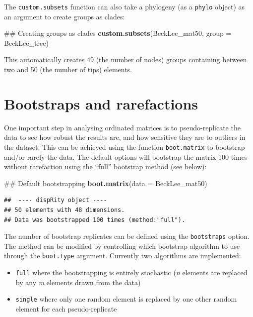 \documentclass[]{book}
\newenvironment{Shaded}{\begin{snugshade}}{\end{snugshade}}
\newcommand{\KeywordTok}[1]{\textcolor[rgb]{0.13,0.29,0.53}{\textbf{#1}}}
\newcommand{\DataTypeTok}[1]{\textcolor[rgb]{0.13,0.29,0.53}{#1}}
\newcommand{\NormalTok}[1]{#1}
\providecommand{\tightlist}{%
  \setlength{\itemsep}{0pt}\setlength{\parskip}{0pt}}
\theoremstyle{definition}
\theoremstyle{definition}
\theoremstyle{remark}
\begin{document}
The \texttt{custom.subsets} function can also take a phylogeny (as a
\texttt{phylo} object) as an argument to create groups as clades:

\begin{Shaded}
\begin{Highlighting}[]
\NormalTok{## Creating groups as clades}
\KeywordTok{custom.subsets}\NormalTok{(BeckLee_mat50, }\DataTypeTok{group =}\NormalTok{ BeckLee_tree)}
\end{Highlighting}
\end{Shaded}

This automatically creates 49 (the number of nodes) groups containing
between two and 50 (the number of tips) elements.

\hypertarget{bootstraps-and-rarefactions}{\section{Bootstraps and
rarefactions}\label{bootstraps-and-rarefactions}}

One important step in analysing ordinated matrices is to
pseudo-replicate the data to see how robust the results are, and how
sensitive they are to outliers in the dataset. This can be achieved
using the function \texttt{boot.matrix} to bootstrap and/or rarefy the
data. The default options will bootstrap the matrix 100 times without
rarefaction using the ``full'' bootstrap method (see below):

\begin{Shaded}
\begin{Highlighting}[]
\NormalTok{## Default bootstrapping}
\KeywordTok{boot.matrix}\NormalTok{(}\DataTypeTok{data =}\NormalTok{ BeckLee_mat50)}
\end{Highlighting}
\end{Shaded}

\begin{verbatim}
##  ---- dispRity object ---- 
## 50 elements with 48 dimensions.
## Data was bootstrapped 100 times (method:"full").
\end{verbatim}

The number of bootstrap replicates can be defined using the
\texttt{bootstraps} option. The method can be modified by controlling
which bootstrap algorithm to use through the \texttt{boot.type}
argument. Currently two algorithms are implemented:

\begin{itemize}
\tightlist
\item
  \texttt{full} where the bootstrapping is entirely stochastic (\emph{n}
  elements are replaced by any \emph{m} elements drawn from the data)
\item
  \texttt{single} where only one random element is replaced by one other
  random element for each pseudo-replicate
\end{itemize}
\end{document}
